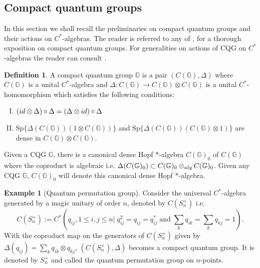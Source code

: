 \documentclass{amsart}
\theoremstyle{plain}
\theoremstyle{definition}
\newtheorem{definition}[subsection]{Definition}
\newtheorem{example}[subsection]{Example}
\theoremstyle{remark}
\numberwithin{equation}{section}
\newcommand{\Dlt}{\Delta}
\newcommand{\raro}{\rightarrow}
\begin{document}
\subsection{Compact quantum groups}
In this section we shall recall the preliminaries on compact quantum groups and their actions on $C^{\ast}$-algebras. The reader is referred to any of \cite{woronowicz1}, \cite{vandaele} for a thorough exposition on compact quantum groups. For generalities on actions of CQG on $C^{\ast}$-algebras the reader can consult \cite{decommer}.  
\begin{definition}
    A compact quantum group $\mathbb{G}$ is a pair $(C(\mathbb{G}),\Dlt)$ where $C(\mathbb{G})$ is a unital $C^{\ast}$-algebra and $\Dlt: C(\mathbb{G})\raro C(\mathbb{G})\otimes C(\mathbb{G})$ is a unital $C^{\ast}$-homomorphism which satisfies the following conditions: 
\begin{enumerate}[(I)]
\setlength\itemsep{0.5em}
    \item $(\rm{id}\otimes \Dlt)\circ \Dlt=(\Dlt \otimes \rm{id})\circ \Dlt$
    \item $\text{Sp}\{\Dlt(C(\mathbb{G}))(1\otimes C(\mathbb{G}))\}$ and $\text{Sp}\{\Dlt(C(\mathbb{G}))(C(\mathbb{G}) \otimes 1)\}$ are dense in $C(\mathbb{G})\otimes C(\mathbb{G})$. 
\end{enumerate}
\end{definition}
Given a CQG $\mathbb{G}$, there is a canonical dense Hopf $\ast$-algebra $C(\mathbb{G})_{0}$ of $C(\mathbb{G})$ where the coproduct is algebraic i.e. $\Delta(C(\mathbb{G})_{0})\subset C(\mathbb{G})_{0}\otimes_{\rm alg}C(\mathbb{G})_{0}$. Given any CQG $\mathbb{G}$, $C(\mathbb{G})_{0}$ will denote this canonical dense Hopf $\ast$-algebra.
\begin{example}[{Quantum permutation group}] Consider the universal $C^{\ast}$-algebra generated by a magic unitary of order $n$, denoted by $C(S_{n}^{+})$ i.e. 
     \begin{displaymath}C(S_{n}^{+}):=C^{\ast}\left(q_{ij}, 1\leq i,j\leq n|\; q_{ij}^2=q_{ij}=q_{ij}^{\ast}\; \text{and} \; \sum\limits_{k}q_{ik}=\sum\limits_{k}q_{kj}=1\right).\end{displaymath} With the coproduct map on the generators of $C(S_{n}^{+})$ given by $\Dlt(q_{ij})=\sum\limits_{k}q_{ik}\otimes q_{kj}$,  $(C(S_{n}^{+}),\Delta)$ becomes a compact quantum group. It is denoted by $S_{n}^{+}$ and called the quantum permutation group on $n$-points.
\end{example}
\end{document}
